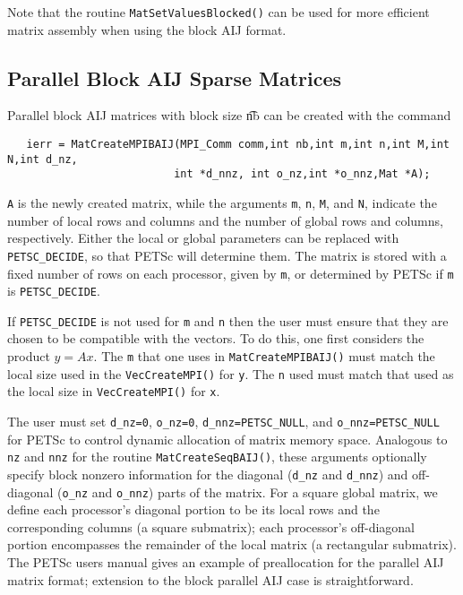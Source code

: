 Note that the routine {\tt MatSetValuesBlocked()}
 can be used for more efficient matrix assembly
when using the block AIJ format.
 
\subsection{Parallel Block AIJ Sparse Matrices}

Parallel block AIJ matrices with block size {\t nb} can be created with
the command 
\begin{verbatim}
   ierr = MatCreateMPIBAIJ(MPI_Comm comm,int nb,int m,int n,int M,int N,int d_nz,
                          int *d_nnz, int o_nz,int *o_nnz,Mat *A);
\end{verbatim}
{\tt A} is the newly created matrix, while the arguments {\tt m}, {\tt n}, 
{\tt M}, and {\tt N}, indicate the number of local rows and columns and
the number of global rows and columns, respectively. Either the local or
global parameters can be replaced with {\tt PETSC\_DECIDE}, so that 
PETSc will determine  them.
The matrix is stored with a fixed number of rows on 
each processor, given by {\tt m}, or determined by PETSc if {\tt m} is
{\tt PETSC\_DECIDE}.

If {\tt PETSC\_DECIDE} is not used for
{\tt m} and {\tt n} then the user must ensure that they are chosen to be
compatible with the vectors. To do this, one first considers the product 
$y = A x$. The {\tt m} that one uses in {\tt MatCreateMPIBAIJ()}
must match the local size used in the {\tt VecCreateMPI()} for {\tt y}.
The {\tt n} used must match that used as the local size in 
{\tt VecCreateMPI()} for {\tt x}. 

The user must set {\tt d\_nz=0}, {\tt o\_nz=0}, {\tt d\_nnz=PETSC\_NULL}, and 
{\tt o\_nnz=PETSC\_NULL} for PETSc to control dynamic allocation of matrix
memory space.  Analogous to {\tt nz} and {\tt nnz} for the routine 
{\tt MatCreateSeqBAIJ()}, these arguments optionally specify 
block nonzero information for the diagonal ({\tt d\_nz} and {\tt d\_nnz}) and 
off-diagonal ({\tt o\_nz} and {\tt o\_nnz}) parts of the matrix. 
For a square global matrix, we define each processor's diagonal portion 
to be its local rows and the corresponding columns (a square submatrix);  
each processor's off-diagonal portion encompasses the remainder of the
local matrix (a rectangular submatrix).  
The PETSc users manual gives an example of preallocation for
the parallel AIJ matrix format; extension to the block parallel AIJ case
is straightforward.


